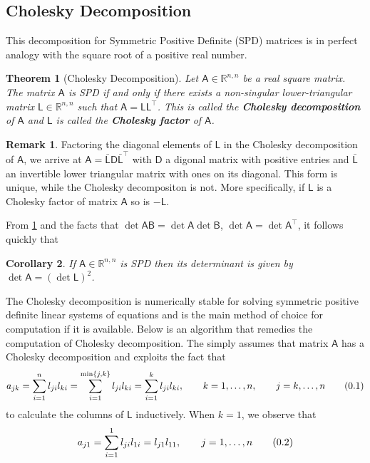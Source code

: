 \documentclass[10pt]{article}
\newtheorem{thm}{Theorem}[section]
\newtheorem{cor}[thm]{Corollary}
\theoremstyle{definition}
\newtheorem*{rem}{Remark}
\newcommand\eqnum{\addtocounter{equation}{1}\tag{\arabic{section}.\arabic{equation}}}
\begin{document}
\subsection{Cholesky Decomposition}
This decomposition for Symmetric Positive Definite (SPD) matrices is in perfect analogy with the square root of a positive real number.
\begin{thm}[Cholesky Decomposition]\label{thm:chol}
Let $\mathsf{A} \in \mathbb{R}^{n,n}$ be a real square matrix. The matrix $\mathsf{A}$ is SPD if and only if there exists a non-singular lower-triangular matrix $\mathsf{L}\in \mathbb{R}^{n,n}$ such that $\mathsf{A}=\mathsf{L} \mathsf{L}^{\top}$. This is called the \textbf{Cholesky decomposition} of $\mathsf{A}$ and $\mathsf{L}$ is called the \textbf{Cholesky factor} of $\mathsf{A}$.
\end{thm}
\begin{rem}
Factoring the diagonal elements of $\mathsf{L}$ in the Cholesky decomposition of $\mathsf{A}$, we arrive at $\mathsf{A}=\bar{\mathsf{L}}\mathsf{D}\bar{\mathsf{L}}^\top$ with $\mathsf{D}$ a digonal matrix with positive entries and $\bar{\mathsf{L}}$ an invertible lower triangular matrix with ones on its diagonal. This form is unique, while the Cholesky decompositon is not. More specifically, if $\mathsf{L}$ is a Cholesky factor of matrix $\mathsf{A}$ so is $-\mathsf{L}$.
\end{rem}
From \cref{thm:chol} and the facts that $\det\mathsf{A}\mathsf{B}=\det\mathsf{A}\det\mathsf{B}$, $\det\mathsf{A}=\det\mathsf{A}^\top$, it follows quickly that
\begin{cor}
If $\mathsf{A} \in \mathbb{R}^{n,n}$  is SPD then its determinant is given by $\det\mathsf{A} = (\det\mathsf{L})^2 $.
\end{cor}
The Cholesky decomposition is numerically stable for solving symmetric positive definite linear systems of equations and is the main method of choice for computation if it is available. Below is an algorithm that remedies the computation of Cholesky decomposition. The  simply assumes that matrix $\mathsf{A}$ has a Cholesky decomposition and exploits the fact that
\begin{equation*}
a_{jk}  = \sum_{i=1}^{n}l_{ji}l_{ki} = 
\sum_{i=1}^{\min\{j, k\}}l_{ji}l_{ki} = 
\sum_{i=1}^{k}l_{ji}l_{ki}, 
\qquad k=1,\dots, n, \qquad j = k,\dots, n
\eqnum
\label{eq:chol}
\end{equation*}
to calculate the columns of $\mathsf{L}$ inductively. When $k=1$, we observe that 
\begin{equation*}
a_{j1} = \sum_{i=1}^{1}l_{ji}l_{1i} = l_{j1}l_{11}, \qquad j = 1,\dots, n
\eqnum
\end{equation*}
\end{document}
